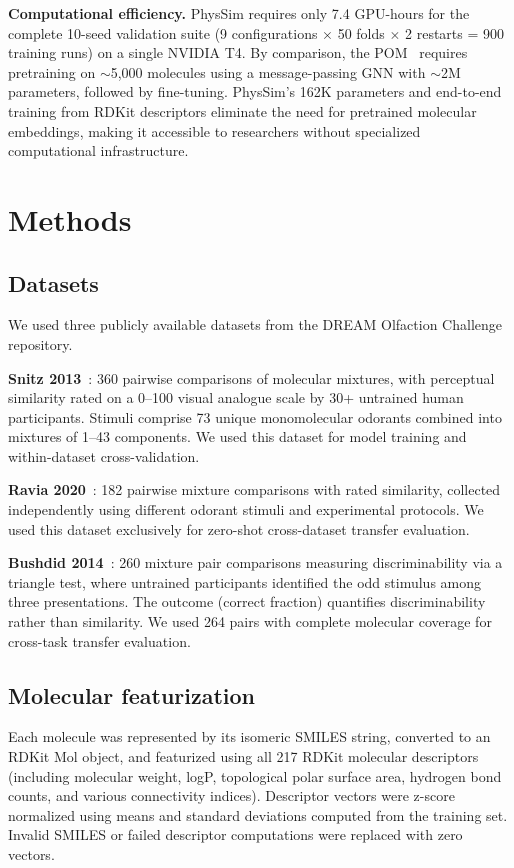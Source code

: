 \documentclass[11pt,a4paper]{article}
\begin{document}
\textbf{Computational efficiency.} PhysSim requires only 7.4 GPU-hours for the complete 10-seed validation suite (9 configurations $\times$ 50 folds $\times$ 2 restarts = 900 training runs) on a single NVIDIA T4. By comparison, the POM~\cite{lee2023pom} requires pretraining on $\sim$5,000 molecules using a message-passing GNN with $\sim$2M parameters, followed by fine-tuning. PhysSim's 162K parameters and end-to-end training from RDKit descriptors eliminate the need for pretrained molecular embeddings, making it accessible to researchers without specialized computational infrastructure.

\section{Methods}

\subsection{Datasets}

We used three publicly available datasets from the DREAM Olfaction Challenge repository.

\textbf{Snitz 2013}~\cite{snitz2013}: 360 pairwise comparisons of molecular mixtures, with perceptual similarity rated on a 0--100 visual analogue scale by 30+ untrained human participants. Stimuli comprise 73 unique monomolecular odorants combined into mixtures of 1--43 components. We used this dataset for model training and within-dataset cross-validation.

\textbf{Ravia 2020}~\cite{ravia2020}: 182 pairwise mixture comparisons with rated similarity, collected independently using different odorant stimuli and experimental protocols. We used this dataset exclusively for zero-shot cross-dataset transfer evaluation.

\textbf{Bushdid 2014}~\cite{bushdid2014}: 260 mixture pair comparisons measuring discriminability via a triangle test, where untrained participants identified the odd stimulus among three presentations. The outcome (correct fraction) quantifies discriminability rather than similarity. We used 264 pairs with complete molecular coverage for cross-task transfer evaluation.

\subsection{Molecular featurization}

Each molecule was represented by its isomeric SMILES string, converted to an RDKit Mol object, and featurized using all 217 RDKit molecular descriptors~\cite{rdkit2023} (including molecular weight, logP, topological polar surface area, hydrogen bond counts, and various connectivity indices). Descriptor vectors were z-score normalized using means and standard deviations computed from the training set. Invalid SMILES or failed descriptor computations were replaced with zero vectors.
\end{document}
